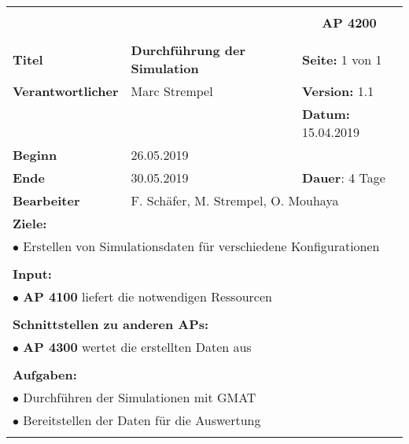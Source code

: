 \clearpage
\begin{table}[!h]
 \begin{center}
  \begin{tabular}{|p{35mm}||p{55mm}|p{50mm}||p{40mm}|}
   \hline
   \multicolumn{3}{|l||}{\textbf{}} & \multicolumn{1}{c|}{}\\
   \multicolumn{3}{|l||}{\textbf{}} & \multicolumn{1}{c|}{\textbf{AP 4200}}\\
   \multicolumn{3}{|l||}{\textbf{}} & \multicolumn{1}{c|}{}\\
   \hline\hline
   \textbf{Titel} & \multicolumn{2}{p{7cm}||}{\textbf{Durchführung der Simulation}} & \textbf{Seite:} 1 von 1\\
   \hline
   \textbf{Verantwortlicher} & \multicolumn{2}{l||}{Marc Strempel} & \textbf{Version:} 1.1\\
   \hline
   \multicolumn{3}{|l||}{} & \textbf{Datum:} 15.04.2019\\
   \hline\hline
   \textbf{Beginn} & \multicolumn{2}{l||}{26.05.2019} & \\
   \hline
   \textbf{Ende} & \multicolumn{2}{l||}{30.05.2019} & \textbf{Dauer}: 4 Tage\\
   \hline\hline
   \textbf{Bearbeiter} & \multicolumn{3}{l|}{F. Schäfer, M. Strempel, O. Mouhaya}\\
   \hline\hline
   \multicolumn{4}{|p{150mm}|}{\textbf{Ziele:}}\\
   \multicolumn{4}{|p{150mm}|}{$\bullet$ Erstellen von Simulationsdaten für verschiedene Konfigurationen}\\
   \multicolumn{4}{|p{150mm}|}{}\\
   \multicolumn{4}{|p{150mm}|}{\textbf{Input:}}\\
   \multicolumn{4}{|p{150mm}|}{$\bullet$ \textbf{AP 4100} liefert die notwendigen Ressourcen}\\
   \multicolumn{4}{|p{150mm}|}{}\\
   \multicolumn{4}{|p{150mm}|}{\textbf{Schnittstellen zu anderen APs:}}\\
   \multicolumn{4}{|p{150mm}|}{$\bullet$ \textbf{AP 4300} wertet die erstellten Daten aus}\\
   \multicolumn{4}{|p{150mm}|}{}\\
   \multicolumn{4}{|p{150mm}|}{\textbf{Aufgaben:}}\\
   \multicolumn{4}{|p{150mm}|}{$\bullet$ Durchführen der Simulationen mit GMAT}\\
   \multicolumn{4}{|p{150mm}|}{$\bullet$ Bereitstellen der Daten für die Auswertung}\\
   \multicolumn{4}{|p{150mm}|}{}\\
   \hline
  \end{tabular}
 \end{center}
\end{table}

